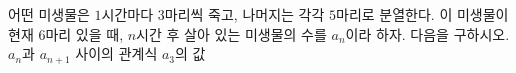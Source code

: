 어떤 미생물은 $1$시간마다 $3$마리씩 죽고, 나머지는 각각 $5$마리로 분열한다. 이 미생물이 현재 $6$마리 있을 때, $n$시간 후 살아 있는 미생물의 수를 $a_n$이라 하자. 다음을 구하시오.
 $a_n$과 $a_{n+1}$ 사이의 관계식
 $a_3$의 값

